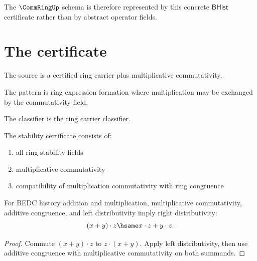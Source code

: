 The $\CommRingUp$ schema is therefore represented by this concrete
$\mathsf{BHist}$ certificate rather than by abstract operator fields.

\section{The certificate}

\begin{definition}
\label{def:commring-source-specification}
The source is a certified ring carrier plus multiplicative commutativity.
\end{definition}

\begin{definition}
\label{def:commring-pattern-specification}
The pattern is ring expression formation where multiplication may be exchanged by the commutativity field.
\end{definition}

\begin{definition}
\label{def:commring-classifier-specification}
The classifier is the ring carrier classifier.
\end{definition}

\begin{definition}
\label{def:commring-stability-certificate}
The stability certificate consists of:
\begin{enumerate}
  \item all ring stability fields
  \item multiplicative commutativity
  \item compatibility of multiplication commutativity with ring congruence
\end{enumerate}
\end{definition}

\begin{theorem}
\label{thm:commring-right-distrib-from-left}
For BEDC history addition and multiplication, multiplicative commutativity,
additive congruence, and left distributivity imply right distributivity:
$$
(x+y)\cdot z \hsame x\cdot z + y\cdot z .
$$
\end{theorem}
\begin{proof}
Commute \((x+y)\cdot z\) to \(z\cdot(x+y)\). Apply left distributivity, then
use additive congruence with multiplicative commutativity on both summands.
\end{proof}


